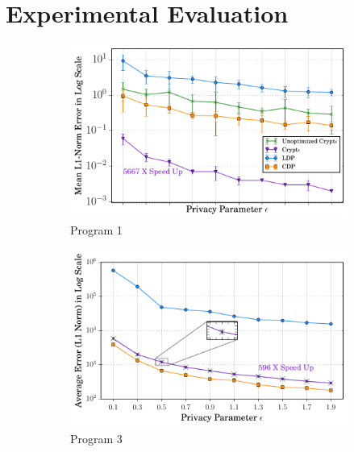 \section{Experimental Evaluation}
\begin{figure}[ht]

    \begin{subfigure}[b]{0.25\linewidth}
        \centering
         \includegraphics[width=1\linewidth]{t8_final.pdf}
        \caption{ Program 1}
        \label{fig:P1}
    \end{subfigure}%
    \begin{subfigure}[b]{0.25\linewidth}
    \centering \includegraphics[width=1\linewidth]{3_final.pdf}
        \caption{Program 3}
        \label{fig:P3}\end{subfigure}%
    \begin{subfigure}[b]{0.25\linewidth}

\end{subfigure}
\end{figure}
